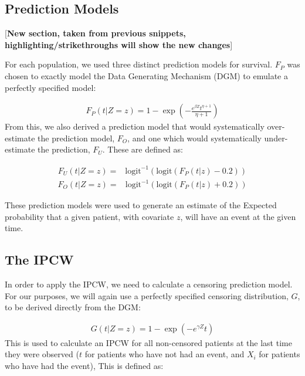 \documentclass[
]{article}
\newcommand{\txt}[1]{\textrm{#1}}
\def\logit{\txt{logit}}
\begin{document}
\hypertarget{prediction-models}{%
\subsection{Prediction Models}\label{prediction-models}}

{[}\textbf{New section, taken from previous snippets, highlighting/strikethroughs will show the new changes}{]}

For each population, we used three distinct prediction models for survival. \(F_P\) was chosen to exactly model the Data Generating Mechanism (DGM) to emulate a perfectly specified model:

\[
\begin{array}{c}
F_P(t|Z = z) = 1 - \exp\left(-\frac{e^{\beta Z}t^{\eta+1}}{\eta+1}\right)
\end{array}
\]
From this, we also derived a prediction model that would systematically over-estimate the prediction model, \(F_O\), and one which would systematically under-estimate the prediction, \(F_U\). These are defined as:

\[
\begin{array}{rl}
F_U(t|Z=z) =& \logit^{-1}\left(\logit\left( F_P(t|z) - 0.2\right)\right)
\end{array}
\]
\[
\begin{array}{rl}
F_O(t|Z=z) =& \logit^{-1}\left(\logit\left( F_P(t|z) + 0.2\right)\right)
\end{array}
\]

These prediction models were used to generate an estimate of the Expected probability that a given patient, with covariate \(z\), will have an event at the given time.

\hypertarget{the-ipcw}{%
\subsection{The IPCW}\label{the-ipcw}}

In order to apply the IPCW, we need to calculate a censoring prediction model. For our purposes, we will again use a perfectly specified censoring distribution, \(G\), to be derived directly from the DGM:

\[
\begin{array}{c}
G(t|Z=z) = 1-\exp\left(-e^{\gamma Z}t\right)
\end{array}
\]
This is used to calculate an IPCW for all non-censored patients at the last time they were observed (\(t\) for patients who have not had an event, and \(X_i\) for patients who have had the event), This is defined as:
\end{document}
